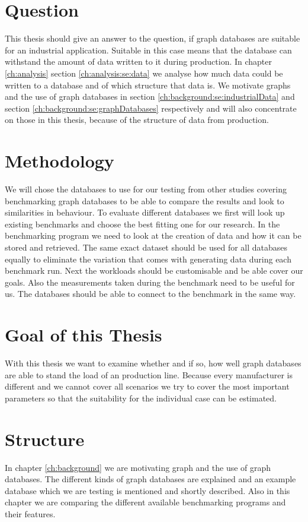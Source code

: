 \section{Question}
This thesis should give an answer to the question, if graph databases are suitable for an industrial application.
Suitable in this case means that the database can withstand the amount of data written to it during production.
In chapter \ref{ch:analysis} section \ref{ch:analysis:se:data} we analyse how much data could be written to a database and of which structure that data is.
We motivate graphs and the use of graph databases in section \ref{ch:background:se:industrialData} and section \ref{ch:background:se:graphDatabases} respectively and will also concentrate on those in this thesis,
because of the structure of data from production.

\section{Methodology}
We will chose the databases to use for our testing from other studies covering benchmarking graph databases to be able to compare the results and look to similarities in behaviour.
To evaluate different databases we first will look up existing benchmarks and choose the best fitting one for our research.
In the benchmarking program we need to look at the creation of data and how it can be stored and retrieved.
The same exact dataset should be used for all databases equally to eliminate the variation that comes with generating data during each benchmark run.
Next the workloads should be customisable and be able cover our goals.
Also the measurements taken during the benchmark need to be useful for us.
The databases should be able to connect to the benchmark in the same way.

\section{Goal of this Thesis}
With this thesis we want to examine whether and if so,
how well graph databases are able to stand the load of an production line.
Because every manufacturer is different and we cannot cover all scenarios we try to cover the most important parameters
so that the suitability for the individual case can be estimated.

\section{Structure}
In chapter \ref{ch:background} we are motivating graph and the use of graph databases.
The different kinds of graph databases are explained and an example database which we are testing is mentioned and shortly described.
Also in this chapter we are comparing the different available benchmarking programs and their features.

